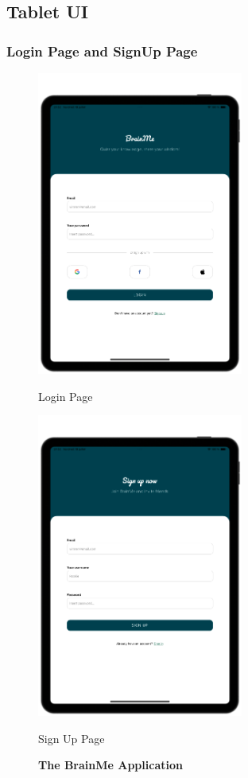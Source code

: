\subsection{Tablet UI}
\subsubsection{Login Page and SignUp Page}


\begin{figure}[H]
    \centering
    \begin{minipage}[b]{0.43\linewidth}
        \centering
        \includegraphics[height=10cm]{TabletUI/Login Page.png}
        \caption{Login Page}
    \end{minipage}
    \hspace{0.1\linewidth}
    \begin{minipage}[b]{0.43\linewidth}
        \centering
        \includegraphics[height=10cm]{TabletUI/Sign Up Page.png}
        \caption{Sign Up Page}
    \end{minipage}
    \vspace{0.5cm}
    \caption{\textbf{The BrainMe Application}}
\end{figure}

